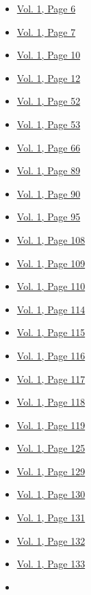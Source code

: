 \begin{itemize}
  \begin{itemize}
  \tightlist
  \item
    \protect\hyperlink{g-page-14}{Vol. 1, Page 6}
  \item
    \protect\hyperlink{g-page-15}{Vol. 1, Page 7}
  \item
    \protect\hyperlink{g-page-18}{Vol. 1, Page 10}
  \item
    \protect\hyperlink{g-page-20}{Vol. 1, Page 12}
  \item
    \protect\hyperlink{g-page-60}{Vol. 1, Page 52}
  \item
    \protect\hyperlink{g-page-61}{Vol. 1, Page 53}
  \item
    \protect\hyperlink{g-page-74}{Vol. 1, Page 66}
  \item
    \protect\hyperlink{g-page-97}{Vol. 1, Page 89}
  \item
    \protect\hyperlink{g-page-98}{Vol. 1, Page 90}
  \item
    \protect\hyperlink{g-page-103}{Vol. 1, Page 95}
  \item
    \protect\hyperlink{g-page-116}{Vol. 1, Page 108}
  \item
    \protect\hyperlink{g-page-117}{Vol. 1, Page 109}
  \item
    \protect\hyperlink{g-page-118}{Vol. 1, Page 110}
  \item
    \protect\hyperlink{g-page-122}{Vol. 1, Page 114}
  \item
    \protect\hyperlink{g-page-123}{Vol. 1, Page 115}
  \item
    \protect\hyperlink{g-page-124}{Vol. 1, Page 116}
  \item
    \protect\hyperlink{g-page-125}{Vol. 1, Page 117}
  \item
    \protect\hyperlink{g-page-126}{Vol. 1, Page 118}
  \item
    \protect\hyperlink{g-page-127}{Vol. 1, Page 119}
  \item
    \protect\hyperlink{g-page-133}{Vol. 1, Page 125}
  \item
    \protect\hyperlink{g-page-137}{Vol. 1, Page 129}
  \item
    \protect\hyperlink{g-page-138}{Vol. 1, Page 130}
  \item
    \protect\hyperlink{g-page-139}{Vol. 1, Page 131}
  \item
    \protect\hyperlink{g-page-140}{Vol. 1, Page 132}
  \item
    \protect\hyperlink{g-page-141}{Vol. 1, Page 133}
  \item

\end{itemize}
\end{itemize}
